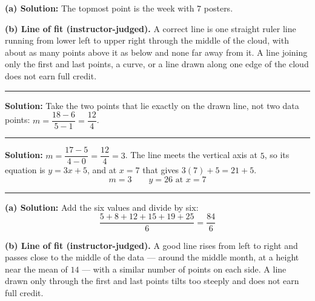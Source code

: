 \documentclass[12pt]{article}
\begin{document}



\textbf{(a) Solution:} \quad The topmost point is the week with $7$ posters. 

\textbf{(b) Line of fit (instructor-judged).} A correct line is one straight ruler line running
from lower left to upper right through the middle of the cloud, with about as many points above
it as below and none far away from it. A line joining only the first and last points, a curve, or
a line drawn along one edge of the cloud does not earn full credit.

\vspace{0.2cm}

\noindent\rule{\linewidth}{0.2pt}


\textbf{Solution:} \quad Take the two points that lie exactly on the drawn line, not two data
points: $m = \dfrac{18 - 6}{5 - 1} = \dfrac{12}{4}$. 

\vspace{0.2cm}

\noindent\rule{\linewidth}{0.2pt}


\textbf{Solution:} \quad $m = \dfrac{17 - 5}{4 - 0} = \dfrac{12}{4} = 3$. The line meets the
vertical axis at $5$, so its equation is $y = 3x + 5$, and at $x = 7$ that gives
$3(7) + 5 = 21 + 5$.
\[ \boxed{m = 3 \qquad y = 26 \text{ at } x = 7} \]

\vspace{0.2cm}

\noindent\rule{\linewidth}{0.2pt}


\textbf{(a) Solution:} \quad Add the six values and divide by six:
\[ \frac{5 + 8 + 12 + 15 + 19 + 25}{6} = \frac{84}{6} \]

\textbf{(b) Line of fit (instructor-judged).} A good line rises from left to right and passes
close to the middle of the data --- around the middle month, at a height near the mean of $14$ ---
with a similar number of points on each side. A line drawn only through the first and last points
tilts too steeply and does not earn full credit.
\end{document}
